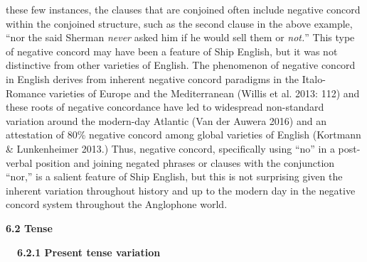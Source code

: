 \begin{styleStandard}
these few instances, the clauses that are conjoined often include negative concord within the conjoined structure, such as the second clause in the above example, “nor the said Sherman \textit{never }asked him if he would sell them or \textit{not.}” This type of negative concord may have been a feature of Ship English, but it was not distinctive from other varieties of English. The phenomenon of negative concord in English derives from inherent negative concord paradigms in the Italo-Romance varieties of Europe and the Mediterranean (Willis et al. 2013: 112) and these roots of negative concordance have led to widespread non-standard variation around the modern-day Atlantic (Van der Auwera 2016) and an attestation of 80\% negative concord among global varieties of English (Kortmann \& Lunkenheimer 2013.) Thus, negative concord, specifically using “no” in a post-verbal position and joining negated phrases or clauses with the conjunction “nor,” is a salient feature of Ship English, but this is not surprising given the inherent variation throughout history and up to the modern day in the negative concord system throughout the Anglophone world. \ 
\end{styleStandard}


\begin{styleStandard}
\textbf{6.2 Tense}
\end{styleStandard}


\begin{styleStandard}
\textbf{\ \ 6.2.1 Present tense variation }
\end{styleStandard}



